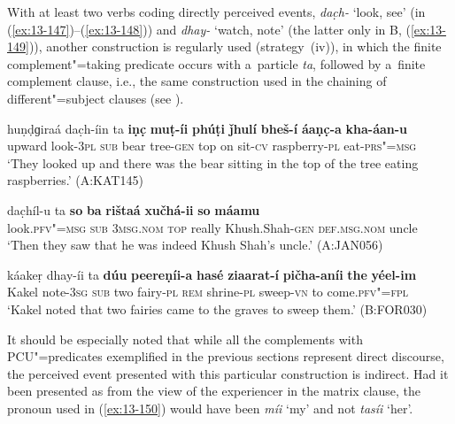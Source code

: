  With at least two verbs coding directly perceived events, \textit{dac̣h-} `look, see' (in (\ref{ex:13-147})--(\ref{ex:13-148})) and \textit{dhay-} `watch, note' (the latter only in B, (\ref{ex:13-149})), another construction is regularly used (strategy~(iv)), in which the finite complement"=taking predicate occurs with a~particle \textit{ta}, followed by a~finite complement clause, i.e., the same construction used in the chaining of different"=subject clauses (see ). 

\begin{exe}
\ex
\label{ex:13-147}
\gll huṇḍɡiraá dac̣h-íin ta \textbf{iṇc̣} \textbf{muṭ-íi} \textbf{phúṭi} \textbf{ǰhulí} \textbf{bheš-í} \textbf{áaṇc̣-a} \textbf{kha-áan-u}\\
upward look-\textsc{3pl} \textsc{sub} bear tree-\textsc{gen} top on sit-\textsc{cv} raspberry-\textsc{pl} eat-\textsc{prs"=msg}\\
\glt `They looked up and there was the bear sitting in the top of the tree eating raspberries.' (A:KAT145)

\ex
\label{ex:13-148}
\gll dac̣híl-u ta \textbf{so} \textbf{ba} \textbf{rištaá} \textbf{xučhá-ii} \textbf{so} \textbf{máamu}\\
look.\textsc{pfv"=msg} \textsc{sub} \textsc{3msg.nom} \textsc{top} really Khush.Shah-\textsc{gen} \textsc{def.msg.nom} uncle\\
\glt `Then they saw that he was indeed Khush Shah's uncle.' (A:JAN056)

\ex
\label{ex:13-149}
\gll káakeṛ dhay-íi ta \textbf{dúu} \textbf{peereṇíi-a} \textbf{hasé} \textbf{ziaarat-í} \textbf{pičha-aníi} \textbf{the} \textbf{yéel-im}\\
Kakel note-\textsc{3sg} \textsc{sub} two fairy-\textsc{pl}  \textsc{rem} shrine-\textsc{pl} sweep-\textsc{vn} to come.\textsc{pfv"=fpl}\\
\glt `Kakel noted that two fairies came to the graves to sweep them.' (B:FOR030) 
\end{exe}

It should be especially noted that while all the complements with PCU"=predicates exemplified in the previous sections represent direct discourse, the perceived event presented with this particular construction is indirect. Had it been presented as from the view of the experiencer in the matrix clause, the pronoun used in (\ref{ex:13-150}) would have been \textit{míi} `my' and not \textit{tasíi} `her'.

